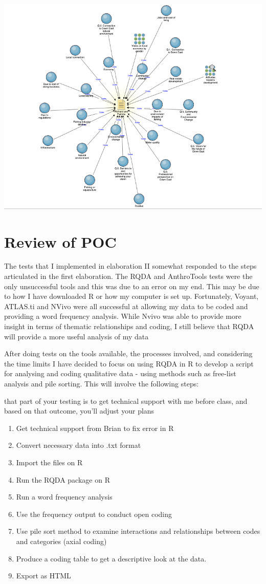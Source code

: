 \documentclass{article}
\begin{document}
\includegraphics[width=\textwidth]{NVivo.png}

\section{Review of POC}
The tests that I implemented in elaboration II somewhat responded to the steps articulated in the first elaboration. The RQDA and AnthroTools tests were the only unsuccessful tools and this was due to an error on my end. This may be due to how I have downloaded R or how my computer is set up. Fortunately, Voyant, ATLAS.ti and NVivo were all successful at allowing my data to be coded and providing a word frequency analysis. While Nvivo was able to provide more insight in terms of thematic relationships and coding, I still believe that RQDA will provide a more useful analysis of my data

After doing tests on the tools available, the processes involved, and considering the time limits I have decided to focus on using RQDA in R to develop a script for analysing and coding qualitative data - using methods such as free-list analysis and pile sorting. This will involve the following steps:

that part of your testing is to get technical support with me before class, and based on that outcome, you'll adjust your plans

\begin{enumerate}
    \item Get technical support from Brian to fix error in R 
    \item Convert necessary data into .txt format
    \item Import the files on R 
    \item Run the RQDA package on R 
    \item Run a word frequency analysis
    \item Use the frequency output to conduct open coding
    \item Use pile sort method to examine interactions and relationships between codes and categories (axial coding)
    \item Produce a coding table to get a descriptive look at the data.
    \item Export as HTML
\end{enumerate}
\end{document}
